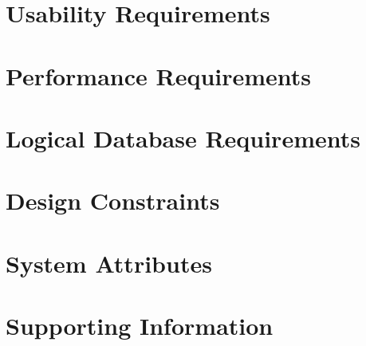 \section{Usability Requirements}

\section{Performance Requirements}

\section{Logical Database Requirements}

\section{Design Constraints}

\section{System Attributes}

\section{Supporting Information}